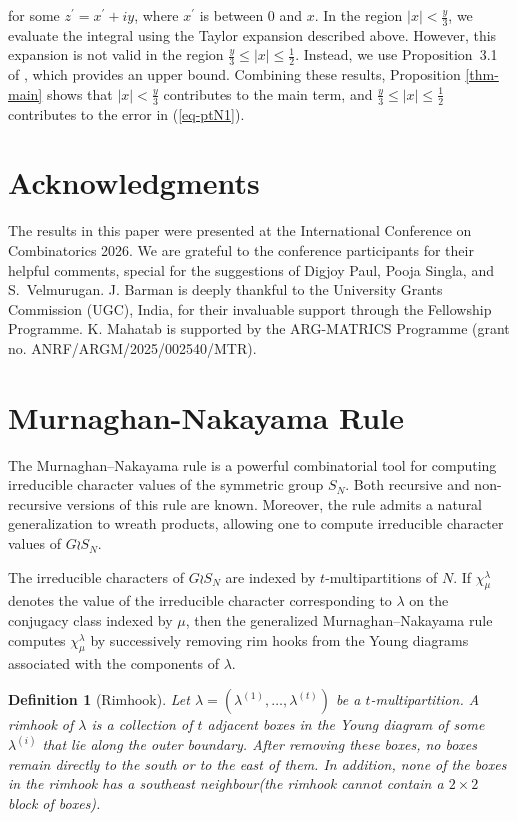 \documentclass[11pt]{amsart}
\theoremstyle{plain}
\newtheorem{definition}{Definition}
\numberwithin{equation}{section}
\begin{document}
	for some $z^{\prime}=x^{\prime}+iy$, where $x^{\prime}$ is between $0$ and $x$. In the region $|x|<\frac{y}{3}$, we evaluate the integral using the Taylor expansion described above. However, this expansion is not valid in the region $\frac{y}{3} \le |x| \le \frac{1}{2}$. Instead, we use Proposition~3.1 of \cite{tyler}, which provides an upper bound. Combining these results, Proposition \ref{thm-main} shows that $|x|<\frac{y}{3}$ contributes to the main term, and $\frac{y}{3}\le |x|\le \frac{1}{2}$ contributes to the error in (\ref{eq-ptN1}).
	
	\section{Acknowledgments}
	The results in this paper were presented at the International Conference on Combinatorics 2026. We are grateful to the conference participants for their helpful comments, special for the suggestions of Digjoy Paul, Pooja Singla, and S.~Velmurugan.
	J. Barman is deeply thankful to the University Grants Commission (UGC), India, for their invaluable support through the Fellowship Programme. K. Mahatab is supported by the ARG-MATRICS Programme (grant no. ANRF/ARGM/2025/002540/MTR).
	
	\section{Murnaghan-Nakayama Rule}  
	The Murnaghan--Nakayama rule is a powerful combinatorial tool for computing irreducible character values of the symmetric group $S_N$. Both recursive and non-recursive versions of this rule are known. Moreover, the rule admits a natural generalization to wreath products, allowing one to compute irreducible character values of $G\wr S_N$.
	
	The irreducible characters of $G\wr S_N$ are indexed by $t$-multipartitions of $N$. If $\chi^\lambda_\mu$ denotes the value of the irreducible character corresponding to $\lambda$ on the conjugacy class indexed by $\mu$, then the generalized Murnaghan--Nakayama rule computes $\chi^\lambda_\mu$ by successively removing rim hooks from the Young diagrams associated with the components of $\lambda$.
	\begin{definition}[Rimhook]
		Let $\lambda=(\lambda^{(1)},\ldots,\lambda^{(t)})$ be a $t$-multipartition. 
		A \emph{rimhook} of $\lambda$ is a collection of $t$ adjacent boxes in the Young diagram of some $\lambda^{(i)}$ that lie along the outer boundary. After removing these boxes, no boxes remain directly to the south or to the east of them. In addition, none of the boxes in the rimhook has a southeast neighbour(the rimhook cannot contain a $2\times2$ block of boxes).
	\end{definition}  
	
\end{document}
